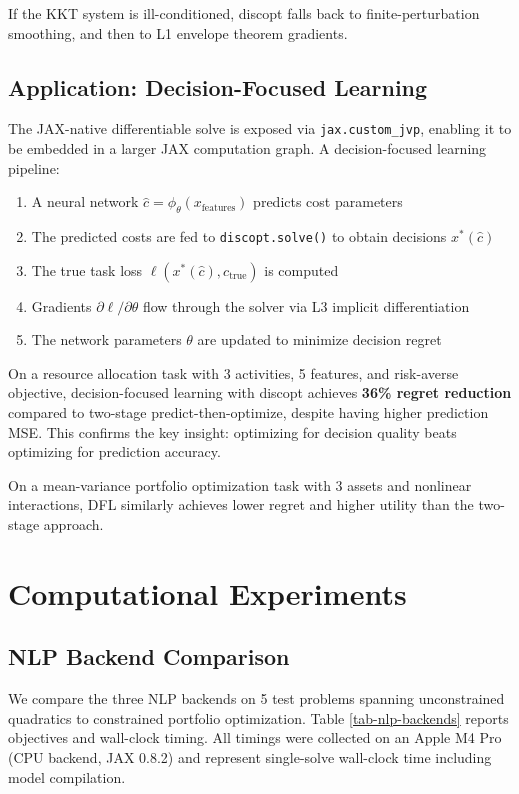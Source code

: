 \documentclass[12pt,preprint]{article}
\begin{document}
If the KKT system is ill-conditioned, discopt falls back to finite-perturbation smoothing, and then to L1 envelope theorem gradients.

\subsection{Application: Decision-Focused Learning}
\label{org-application-decision-focused-learning}
The JAX-native differentiable solve is exposed via \texttt{jax.custom\_jvp}, enabling it to be embedded in a larger JAX computation graph. A decision-focused learning pipeline:


\begin{enumerate}
\item A neural network $\hat{c} = \phi_\theta(x_{\mathrm{features}})$ predicts cost parameters

\item The predicted costs are fed to \texttt{discopt.solve()} to obtain decisions $x^*(\hat{c})$

\item The true task loss $\ell(x^*(\hat{c}), c_{\mathrm{true}})$ is computed

\item Gradients $\partial \ell / \partial \theta$ flow through the solver via L3 implicit differentiation

\item The network parameters $\theta$ are updated to minimize decision regret

\end{enumerate}


On a resource allocation task with 3 activities, 5 features, and risk-averse objective, decision-focused learning with discopt achieves \textbf{36\% regret reduction} compared to two-stage predict-then-optimize, despite having higher prediction MSE. This confirms the key insight: optimizing for decision quality beats optimizing for prediction accuracy.


On a mean-variance portfolio optimization task with 3 assets and nonlinear interactions, DFL similarly achieves lower regret and higher utility than the two-stage approach.


\section{Computational Experiments}
\label{org-computational-experiments}
\subsection{NLP Backend Comparison}
\label{org-nlp-backend-comparison}
We compare the three NLP backends on 5 test problems spanning unconstrained quadratics to constrained portfolio optimization. Table \ref{tab-nlp-backends} reports objectives and wall-clock timing. All timings were collected on an Apple M4 Pro (CPU backend, JAX 0.8.2) and represent single-solve wall-clock time including model compilation.
\end{document}
